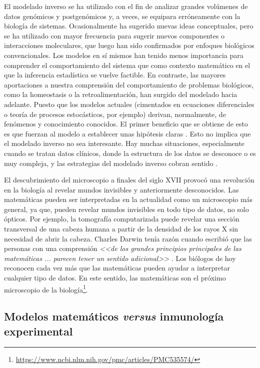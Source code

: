 El modelado inverso se ha utilizado con el fin de analizar grandes volúmenes de datos genómicos y postgenómicos y, a veces, se equipara erróneamente con la biología de sistemas. Ocasionalmente ha sugerido nuevas ideas conceptuales, pero se ha utilizado con mayor frecuencia para sugerir nuevos componentes o interacciones moleculares, que luego han sido confirmados por enfoques biológicos convencionales. Los modelos en sí mismos han tenido menos importancia para comprender el comportamiento del sistema que como contexto matemático en el que la inferencia estadística se vuelve factible. En contraste, las mayores aportaciones a nuestra comprensión del comportamiento de problemas biológicos, como la homeostasis o la retroalimentación, han surgido del modelado hacia adelante. Puesto que los modelos actuales (cimentados en ecuaciones diferenciales o teoría de procesos estocásticos, por ejemplo) derivan, normalmente, de fenómenos y conocimiento conocidos. El primer beneficio que se obtiene de esto es que fuerzan al modelo a establecer unas hipótesis claras \citep{mathsModInmu}. Esto no implica que el modelado inverso no sea interesante. Hay muchas situaciones, especialmente cuando se tratan datos clínicos, donde la estructura de los datos se desconoce o es muy compleja, y las estrategias del modelado inverso cobran sentido \citep{Gunawardena2014}. 

El descubrimiento del microscopio a finales del siglo XVII provocó una revolución en la biología al revelar mundos invisibles y anteriormente desconocidos. Las matemáticas pueden ser interpretadas en la actualidad como un microscopio más general, ya que, pueden revelar mundos invisibles en todo tipo de datos, no solo ópticos. Por ejemplo, la tomografía computarizada puede revelar una sección transversal de una cabeza humana a partir de la densidad de los rayos X sin necesidad de abrir la cabeza. Charles Darwin tenía razón cuando escribió que las personas con una comprensión \textit{<<de los grandes principios principales de las matemáticas ... parecen tener un sentido adicional>>} \citep{darwin1887life}. Los biólogos de hoy reconocen cada vez más que las matemáticas pueden ayudar a interpretar cualquier tipo de datos. En este sentido, las matemáticas son el próximo microscopio de la biología\footnote{\url{https://www.ncbi.nlm.nih.gov/pmc/articles/PMC535574/}}.

\subsection{Modelos matemáticos \textit{versus} inmunología experimental}
\label{sub:modelosvsinmuno}

